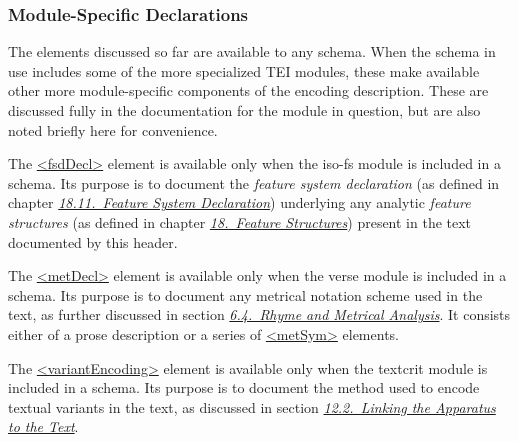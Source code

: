 \subsubsection[{Module-Specific Declarations}]{Module-Specific Declarations}\label{HDENCOTH}\par
The elements discussed so far are available to any schema. When the schema in use includes some of the more specialized TEI modules, these make available other more module-specific components of the encoding description. These are discussed fully in the documentation for the module in question, but are also noted briefly here for convenience. \par
The \hyperref[TEI.fsdDecl]{<fsdDecl>} element is available only when the \textsf{iso-fs} module is included in a schema. Its purpose is to document the \textit{feature system declaration} (as defined in chapter \textit{\hyperref[FD]{18.11.\ Feature System Declaration}}) underlying any analytic \textit{feature structures} (as defined in chapter \textit{\hyperref[FS]{18.\ Feature Structures}}) present in the text documented by this header.\par
The \hyperref[TEI.metDecl]{<metDecl>} element is available only when the \textsf{verse} module is included in a schema. Its purpose is to document any metrical notation scheme used in the text, as further discussed in section \textit{\hyperref[VEME]{6.4.\ Rhyme and Metrical Analysis}}. It consists either of a prose description or a series of \hyperref[TEI.metSym]{<metSym>} elements.\par
The \hyperref[TEI.variantEncoding]{<variantEncoding>} element is available only when the \textsf{textcrit} module is included in a schema. Its purpose is to document the method used to encode textual variants in the text, as discussed in section \textit{\hyperref[TCAPLK]{12.2.\ Linking the Apparatus to the Text}}.
